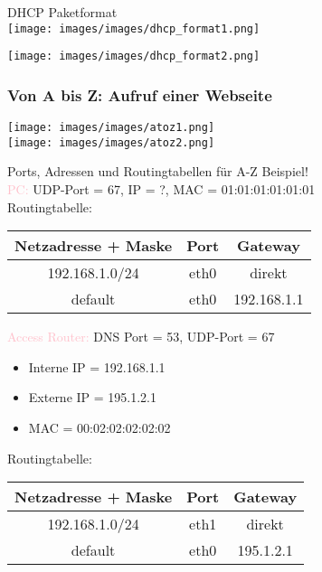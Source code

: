 \begin{definition}{DHCP Paketformat}\\
    \texttt{[image: images/images/dhcp\_format1.png]}

    \vspace{2mm}

    \texttt{[image: images/images/dhcp\_format2.png]}
\end{definition}

\subsubsection*{Von A bis Z: Aufruf einer Webseite}

\texttt{[image: images/images/atoz1.png]}\\
\texttt{[image: images/images/atoz2.png]}



\begin{example2}{Ports{,} Adressen und Routingtabellen} für A-Z Beispiel!\\
    \textcolor{pink}{PC:} UDP-Port = 67, IP = ?, MAC = 01:01:01:01:01:01\\
    Routingtabelle:\\
    \begin{tabular}{|c|c|c|}
        \hline
        Netzadresse + Maske & Port & Gateway\\
        \hline
        192.168.1.0/24 & eth0 & direkt\\
        \hline
        default & eth0 & 192.168.1.1\\
        \hline
    \end{tabular}

    \vspace{2mm}

    \textcolor{pink}{Access Router:} DNS Port = 53, UDP-Port = 67
    \begin{itemize}
        \item Interne IP = 192.168.1.1
        \item Externe IP = 195.1.2.1
        \item MAC = 00:02:02:02:02:02
    \end{itemize}
    Routingtabelle:\\
    \begin{tabular}{|c|c|c|}
        \hline
        Netzadresse + Maske & Port & Gateway\\
        \hline
        192.168.1.0/24 & eth1 & direkt\\
        \hline
        default & eth0 & 195.1.2.1\\
        \hline
    \end{tabular}

\end{example2}
